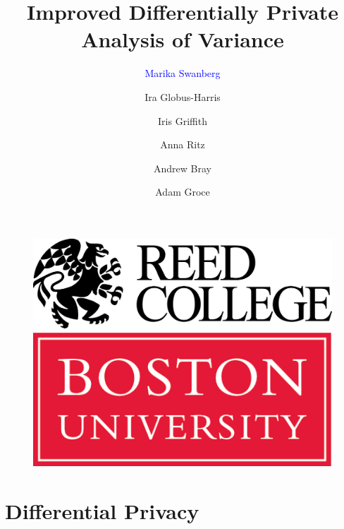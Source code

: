 \documentclass{beamer}
\title[Improved Private ANOVA]{Improved Differentially Private Analysis of Variance}
\author[Marika Swanberg]{\textcolor{blue}{Marika Swanberg} \and Ira Globus-Harris \and Iris Griffith \and \newline Anna Ritz \and  Andrew Bray \and Adam Groce}
\date{}
\begin{document}
\begin{frame}
\titlepage

\begin{figure}[!tbp]
  \centering
  \begin{minipage}[b]{0.45\textwidth}
    \includegraphics[width=\textwidth]{images/reed-logo}
  \end{minipage}
  \hfill
  \begin{minipage}[b]{0.45\textwidth}
    \includegraphics[width=\textwidth]{images/BU-logo}
  \end{minipage}
\end{figure}

\end{frame}


\section{Differential Privacy}
\end{document}
